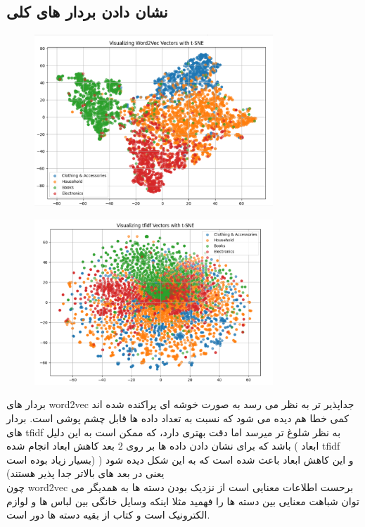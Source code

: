 \documentclass[a4paper,12pt]{article}
\begin{document}
\subsection{نشان دادن بردار های کلی }
\begin{figure}[H]
    \centering
    \includegraphics[width=0.8\textwidth]{word2vec.png}
    \label{fig:yourlabel}
\end{figure}
\begin{figure}[H]
    \centering
    \includegraphics[width=0.8\textwidth]{tfidf.png}
    \label{fig:yourlabel}
\end{figure}
بردار های word2vec جداپذیر تر به نظر می رسد به صورت خوشه ای پراکنده شده اند کمی خطا هم دیده می شود که نسبت به تعداد داده ها قابل چشم پوشی است. بردار های tfidf به نظر شلوغ تر میرسد اما دقت بهتری دارد، که ممکن است به این دلیل باشد که برای نشان دادن داده ها بر روی 2 بعد کاهش ابعاد انجام شده ( ابعاد tfidf بسیار زیاد بوده است) و  این کاهش ابعاد باعث شده است که به این شکل دیده شود ( یعنی در بعد های بالاتر جدا پذیر هستند)
\\
چون word2vec برحست اطلاعات معنایی است از نزدیک بودن دسته ها به همدیگر می توان شباهت معنایی بین دسته ها را فهمید مثلا اینکه وسایل خانگی بین لباس ها و لوازم الکترونیک است و کتاب از بقیه دسته ها دور است.
\end{document}
